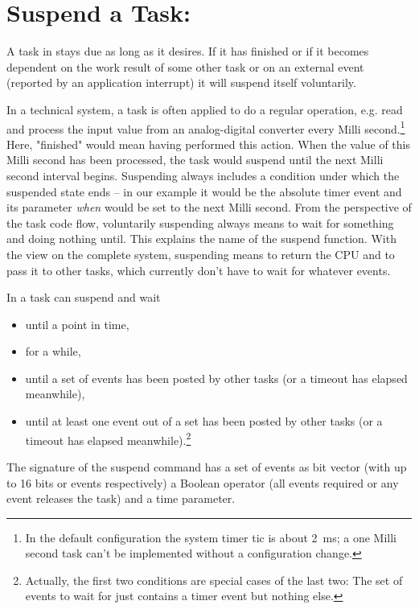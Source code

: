 \section{Suspend a Task: }
\label{secAPIWaitForEvent}

A task in \rtos{} stays due as long as it desires. If it has finished or
if it becomes dependent on the work result of some other task or on an
external event (reported by an application interrupt) it will suspend
itself voluntarily.

In a technical system, a task is often applied to do a regular operation,
e.g. read and process the input value from an analog-digital converter
every Milli second.\footnote{In the \rtos{} default configuration the
system timer tic is about 2~ms; a one Milli second task can't be
implemented without a configuration change.} Here, "finished" would mean
having performed this action. When the value of this Milli second has been
processed, the task would suspend until the next Milli second interval
begins. Suspending always includes a condition under which the suspended
state ends -- in our example it would be the absolute timer event and its
parameter \emph{when} would be set to the next Milli second. From the
perspective of the task code flow, voluntarily suspending always means to
wait for something and doing nothing until. This explains the name of the
suspend function. With the view on the complete system, suspending means
to return the CPU and to pass it to other tasks, which currently don't
have to wait for whatever events.

In \rtos{} a task can suspend and wait
\begin{itemize}
  \item until a point in time,
  \item for a while,
  \item until a set of events has been posted by other tasks (or a timeout
    has elapsed meanwhile),
  \item until at least one event out of a set has been posted by other
    tasks (or a timeout has elapsed meanwhile).\footnote{Actually, the
    first two conditions are special cases of the last two: The set of
    events to wait for just contains a timer event but nothing else.}
\end{itemize}

The signature of the suspend command has a set of events as bit vector
(with up to 16 bits or events respectively) a Boolean operator (all events
required or any event releases the task) and a time parameter.


